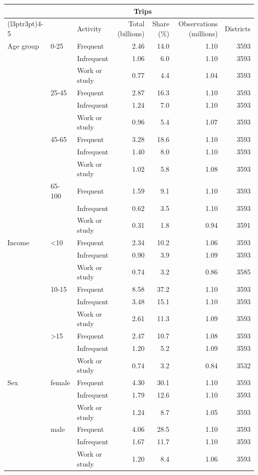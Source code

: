 
\begin{tabular}{lllrrrr}
\toprule
\multicolumn{3}{c}{ } & \multicolumn{2}{c}{Trips} & \multicolumn{2}{c}{ } \\
\cmidrule(l{3pt}r{3pt}){4-5}
 &  & Activity & Total (billions) & Share (\%) & Observations (millions) & Districts\\
\midrule
Age group & 0-25 & Frequent & 2.46 & 14.0 & 1.10 & 3593\\
 &  & Infrequent & 1.06 & 6.0 & 1.10 & 3593\\
 &  & Work or study & 0.77 & 4.4 & 1.04 & 3593\\
 & 25-45 & Frequent & 2.87 & 16.3 & 1.10 & 3593\\
 &  & Infrequent & 1.24 & 7.0 & 1.10 & 3593\\
 &  & Work or study & 0.96 & 5.4 & 1.07 & 3593\\
 & 45-65 & Frequent & 3.28 & 18.6 & 1.10 & 3593\\
 &  & Infrequent & 1.40 & 8.0 & 1.10 & 3593\\
 &  & Work or study & 1.02 & 5.8 & 1.08 & 3593\\
 & 65-100 & Frequent & 1.59 & 9.1 & 1.10 & 3593\\
 &  & Infrequent & 0.62 & 3.5 & 1.10 & 3593\\
 &  & Work or study & 0.31 & 1.8 & 0.94 & 3591\\
\midrule
Income & <10 & Frequent & 2.34 & 10.2 & 1.06 & 3593\\
 &  & Infrequent & 0.90 & 3.9 & 1.09 & 3593\\
 &  & Work or study & 0.74 & 3.2 & 0.86 & 3585\\
 & 10-15 & Frequent & 8.58 & 37.2 & 1.10 & 3593\\
 &  & Infrequent & 3.48 & 15.1 & 1.10 & 3593\\
 &  & Work or study & 2.61 & 11.3 & 1.09 & 3593\\
 & >15 & Frequent & 2.47 & 10.7 & 1.08 & 3593\\
 &  & Infrequent & 1.20 & 5.2 & 1.09 & 3593\\
 &  & Work or study & 0.74 & 3.2 & 0.84 & 3532\\
\midrule
Sex & female & Frequent & 4.30 & 30.1 & 1.10 & 3593\\
 &  & Infrequent & 1.79 & 12.6 & 1.10 & 3593\\
 &  & Work or study & 1.24 & 8.7 & 1.05 & 3593\\
 & male & Frequent & 4.06 & 28.5 & 1.10 & 3593\\
 &  & Infrequent & 1.67 & 11.7 & 1.10 & 3593\\
 &  & Work or study & 1.20 & 8.4 & 1.06 & 3593\\
\bottomrule
\end{tabular}

